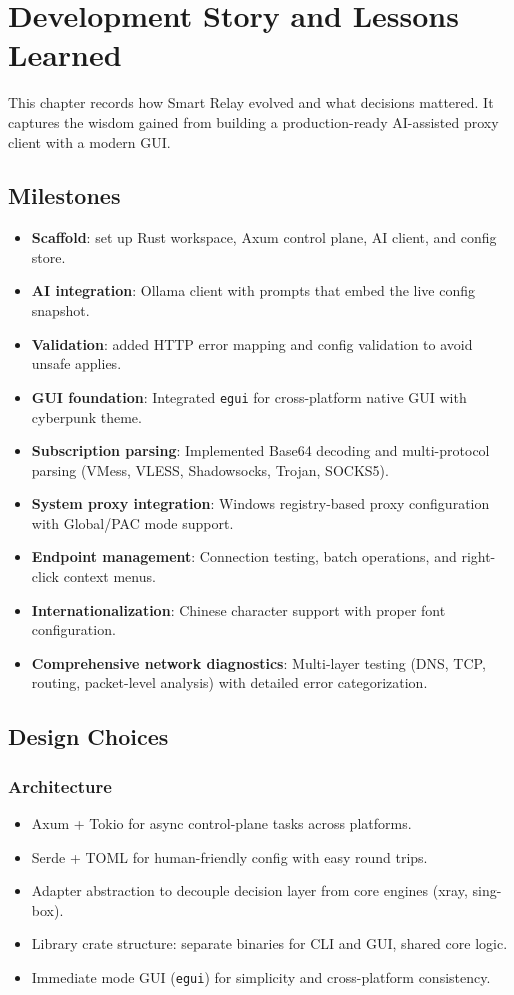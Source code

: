 \chapter{Development Story and Lessons Learned}

This chapter records how Smart Relay evolved and what decisions mattered. It captures the wisdom gained from building a production-ready AI-assisted proxy client with a modern GUI.

\section{Milestones}
\begin{itemize}
    \item \textbf{Scaffold}: set up Rust workspace, Axum control plane, AI client, and config store.
    \item \textbf{AI integration}: Ollama client with prompts that embed the live config snapshot.
    \item \textbf{Validation}: added HTTP error mapping and config validation to avoid unsafe applies.
    \item \textbf{GUI foundation}: Integrated \texttt{egui} for cross-platform native GUI with cyberpunk theme.
    \item \textbf{Subscription parsing}: Implemented Base64 decoding and multi-protocol parsing (VMess, VLESS, Shadowsocks, Trojan, SOCKS5).
    \item \textbf{System proxy integration}: Windows registry-based proxy configuration with Global/PAC mode support.
    \item \textbf{Endpoint management}: Connection testing, batch operations, and right-click context menus.
    \item \textbf{Internationalization}: Chinese character support with proper font configuration.
    \item \textbf{Comprehensive network diagnostics}: Multi-layer testing (DNS, TCP, routing, packet-level analysis) with detailed error categorization.
\end{itemize}

\section{Design Choices}

\subsection{Architecture}
\begin{itemize}
    \item Axum + Tokio for async control-plane tasks across platforms.
    \item Serde + TOML for human-friendly config with easy round trips.
    \item Adapter abstraction to decouple decision layer from core engines (xray, sing-box).
    \item Library crate structure: separate binaries for CLI and GUI, shared core logic.
    \item Immediate mode GUI (\texttt{egui}) for simplicity and cross-platform consistency.
\end{itemize}


